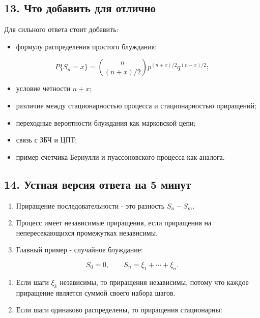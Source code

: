 \documentclass[
  11pt,
  a4paper,
]{article}
\providecommand{\tightlist}{%
  \setlength{\itemsep}{0pt}\setlength{\parskip}{0pt}}
\begin{document}
\subsection{13. Что добавить для
отлично}\label{ux447ux442ux43e-ux434ux43eux431ux430ux432ux438ux442ux44c-ux434ux43bux44f-ux43eux442ux43bux438ux447ux43dux43e}

Для сильного ответа стоит добавить:

\begin{itemize}
\tightlist
\item
  формулу распределения простого блуждания:
\end{itemize}

\[
P\{S_n=x\}
=
\binom n{(n+x)/2}p^{(n+x)/2}q^{(n-x)/2};
\]

\begin{itemize}
\tightlist
\item
  условие четности \(n+x\);
\item
  различие между стационарностью процесса и стационарностью приращений;
\item
  переходные вероятности блуждания как марковской цепи;
\item
  связь с ЗБЧ и ЦПТ;
\item
  пример счетчика Бернулли и пуассоновского процесса как аналога.
\end{itemize}

\subsection{14. Устная версия ответа на 5
минут}\label{ux443ux441ux442ux43dux430ux44f-ux432ux435ux440ux441ux438ux44f-ux43eux442ux432ux435ux442ux430-ux43dux430-5-ux43cux438ux43dux443ux442}

\begin{enumerate}
\def\labelenumi{\arabic{enumi}.}
\tightlist
\item
  Приращение последовательности - это разность \(S_n-S_m\).
\item
  Процесс имеет независимые приращения, если приращения на
  непересекающихся промежутках независимы.
\item
  Главный пример - случайное блуждание:
\end{enumerate}

\[
S_0=0,
\qquad
S_n=\xi_1+\cdots+\xi_n.
\]

\begin{enumerate}
\def\labelenumi{\arabic{enumi}.}
\setcounter{enumi}{3}
\tightlist
\item
  Если шаги \(\xi_k\) независимы, то приращения независимы, потому что
  каждое приращение является суммой своего набора шагов.
\item
  Если шаги одинаково распределены, то приращения стационарны:
\end{enumerate}
\end{document}
